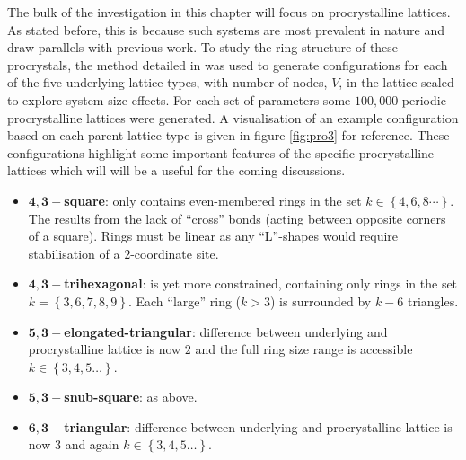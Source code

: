 The bulk of the investigation in this chapter will focus on procrystalline lattices. 
As stated before, this is because such systems are most prevalent in nature and draw parallels with previous work. 
To study the ring structure of these procrystals, the \mc{} method detailed in  was used to generate configurations for each of the five underlying lattice types, with number of nodes, $V$, in the lattice scaled to explore system size effects.
For each set of parameters some $100,000$ periodic procrystalline lattices were generated.
A visualisation of an example configuration based on each parent lattice type is given in figure \ref{fig:pro3} for reference. 
These configurations highlight some important features of the specific procrystalline lattices which will will be a useful for the coming discussions.

\begin{itemize}
	\item $\mathbf{4,3-}$\textbf{square}: only contains even\--membered rings in the set $k\in\left\{4,6,8\cdots\right\}$. The results from the lack of ``cross'' bonds (acting between opposite corners of a square). Rings must be linear as any ``L''\--shapes would require stabilisation of a $2$\--coordinate site. 
	\item $\mathbf{4,3-}$\textbf{trihexagonal}: is yet more constrained, containing only rings in the set $k=\left\{3,6,7,8,9\right\}$. Each ``large'' ring ($k>3$) is surrounded by $k-6$ triangles.
	\item $\mathbf{5,3-}$\textbf{elongated\--triangular}: difference between underlying and procrystalline lattice is now $2$ and the full ring size range is accessible $k\in\left\{3,4,5\dots\right\}$.
	\item $\mathbf{5,3-}$\textbf{snub\--square}: as above.
	\item $\mathbf{6,3-}$\textbf{triangular}: difference between underlying and procrystalline lattice is now $3$ and again $k\in\left\{3,4,5\dots\right\}$.	
\end{itemize}

